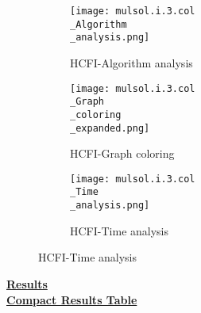\documentclass[10pt]{article}
\begin{document}
\graphicspath{{./Core1/Solutions/HCFI/mulsol.i.3.col}}
\begin{figure}[H]
\begin{subfigure}{.33\textwidth}
  \centering
  \texttt{[image: mulsol.i.3.col\\\_Algorithm\\\_analysis.png]}
  \caption{HCFI-Algorithm analysis}
   \label{fig:subfig1}
\end{subfigure}%
\begin{subfigure}{.33\textwidth}
  \centering
  \texttt{[image: mulsol.i.3.col\\\_Graph\\\_coloring\\\_expanded.png]}
  \caption{HCFI-Graph coloring}
  \label{fig:subfig2}
\end{subfigure}
\begin{subfigure}{.33\textwidth}
  \centering
  \texttt{[image: mulsol.i.3.col\\\_Time\\\_analysis.png]}
  \caption{HCFI-Time analysis}
  \end{subfigure}
\end{figure}
\vspace{2cm}
\begin{center}
\hyperlink{page.8}{\textbf{Results}}\\
\vspace{0.5cm}
\hyperlink{page.71}{\textbf{Compact Results Table}}
\end{center}
\pagebreak
\end{document}
